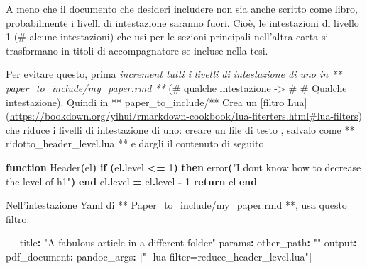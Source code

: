 \documentclass[a4paper, 11pt, nobind]{templates/ociamthesis}
\newenvironment{Shaded}{\begin{snugshade}}{\end{snugshade}}
\newcommand{\AttributeTok}[1]{\textcolor[rgb]{0.77,0.63,0.00}{#1}}
\newcommand{\ControlFlowTok}[1]{\textcolor[rgb]{0.13,0.29,0.53}{\textbf{#1}}}
\newcommand{\DecValTok}[1]{\textcolor[rgb]{0.00,0.00,0.81}{#1}}
\newcommand{\FunctionTok}[1]{\textcolor[rgb]{0.00,0.00,0.00}{#1}}
\newcommand{\KeywordTok}[1]{\textcolor[rgb]{0.13,0.29,0.53}{\textbf{#1}}}
\newcommand{\NormalTok}[1]{#1}
\newcommand{\OperatorTok}[1]{\textcolor[rgb]{0.81,0.36,0.00}{\textbf{#1}}}
\newcommand{\PreprocessorTok}[1]{\textcolor[rgb]{0.56,0.35,0.01}{\textit{#1}}}
\newcommand{\StringTok}[1]{\textcolor[rgb]{0.31,0.60,0.02}{#1}}
\renewenvironment{Shaded}
{
  \vspace{10pt}%
  \begin{snugshade}%
}{%
  \end{snugshade}%
  \vspace{8pt}%
}
\begin{document}
A meno che il documento che desideri includere non sia anche scritto come libro, probabilmente i livelli di intestazione saranno fuori.
Cioè, le intestazioni di livello 1 (\# alcune intestazioni) che usi per le sezioni principali nell'altra carta si trasformano in titoli di accompagnatore se incluse nella tesi.

Per evitare questo, prima \emph{increment tutti i livelli di intestazione di uno in ** paper\_to\_include/my\_paper.rmd ** } (\# qualche intestazione -\textgreater{} \# \# Qualche intestazione).
Quindi in ** paper\_to\_include/** Crea un {[}filtro Lua{]} (\url{https://bookdown.org/yihui/rmarkdown-cookbook/lua-fiterters.html\#lua-filters}) che riduce i livelli di intestazione di uno: creare un file di testo , salvalo come ** ridotto\_header\_level.lua ** e dargli il contenuto di seguito.

\begin{Shaded}
\begin{Highlighting}[]
\KeywordTok{function}\NormalTok{ Header}\OperatorTok{(}\NormalTok{el}\OperatorTok{)}
  \ControlFlowTok{if} \OperatorTok{(}\NormalTok{el}\OperatorTok{.}\NormalTok{level }\OperatorTok{\textless{}=} \DecValTok{1}\OperatorTok{)} \ControlFlowTok{then}
    \FunctionTok{error}\OperatorTok{(}\StringTok{"I don\textquotesingle{}t know how to decrease the level of h1"}\OperatorTok{)}
  \ControlFlowTok{end}
\NormalTok{  el}\OperatorTok{.}\NormalTok{level }\OperatorTok{=}\NormalTok{ el}\OperatorTok{.}\NormalTok{level }\OperatorTok{{-}} \DecValTok{1}
  \ControlFlowTok{return}\NormalTok{ el}
\KeywordTok{end}
\end{Highlighting}
\end{Shaded}

Nell'intestazione Yaml di ** Paper\_to\_include/my\_paper.rmd **, usa questo filtro:

\begin{Shaded}
\begin{Highlighting}[]
\PreprocessorTok{{-}{-}{-}}
\FunctionTok{title}\KeywordTok{:}\AttributeTok{ }\StringTok{"A fabulous article in a different folder"}
\FunctionTok{params}\KeywordTok{:}
\AttributeTok{  }\FunctionTok{other\_path}\KeywordTok{:}\AttributeTok{ }\StringTok{""}
\FunctionTok{output}\KeywordTok{:}
\AttributeTok{  }\FunctionTok{pdf\_document}\KeywordTok{:}\AttributeTok{ }
\AttributeTok{    }\FunctionTok{pandoc\_args}\KeywordTok{:}\AttributeTok{ }\KeywordTok{[}\StringTok{"{-}{-}lua{-}filter=reduce\_header\_level.lua"}\KeywordTok{]}
\PreprocessorTok{{-}{-}{-}}
\end{Highlighting}
\end{Shaded}
\end{document}

